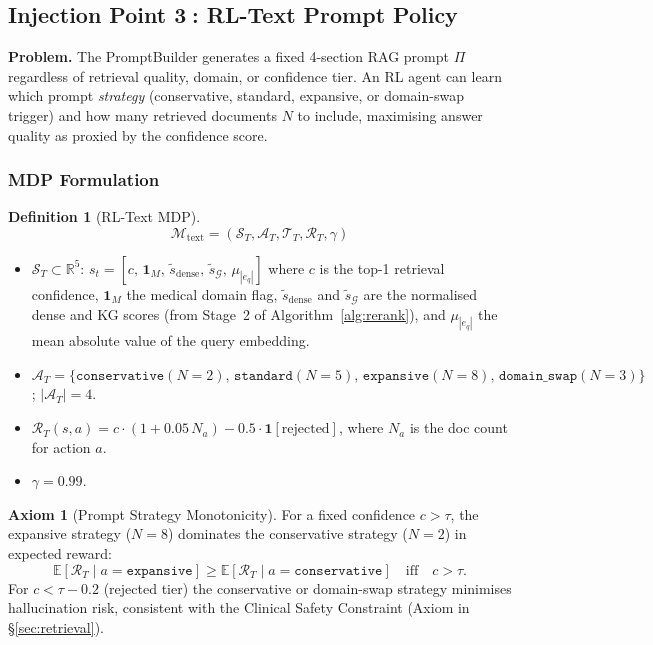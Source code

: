 \documentclass[12pt,a4paper]{article}
\theoremstyle{definition}
\newtheorem{definition}{Definition}[section]
\newtheorem{axiom}{Axiom}[section]
\theoremstyle{plain}
\theoremstyle{remark}
\newcommand{\R}{\mathbb{R}}
\newcommand{\KG}{\mathcal{G}}
\newcommand{\EE}{\mathbb{E}}
\begin{document}
\subsection{Injection Point \textcircled{3}: RL-Text Prompt Policy}
\label{sec:rl_text}

\begin{tcolorbox}[rlinjbox,title={Injection \textcircled{3} --- RL-Text}]
\textbf{Problem.}
The PromptBuilder generates a fixed 4-section RAG prompt $\Pi$ regardless of
retrieval quality, domain, or confidence tier.  An RL agent can learn which
prompt \emph{strategy} (conservative, standard, expansive, or domain-swap trigger)
and how many retrieved documents $N$ to include, maximising answer quality as
proxied by the confidence score.
\end{tcolorbox}

\subsubsection{MDP Formulation}

\begin{definition}[RL-Text MDP]
\label{def:rl_text_mdp}
\[
  \mathcal{M}_{\text{text}} = (\mathcal{S}_T,\mathcal{A}_T,\mathcal{T}_T,\mathcal{R}_T,\gamma)
\]
\begin{itemize}[nosep]
  \item $\mathcal{S}_T \subset \R^5$:
        $s_t = [c,\, \mathbf{1}_{M},\, \tilde{s}_{\text{dense}},\,
        \tilde{s}_{\KG},\, \mu_{|e_q|}]$
        where $c$ is the top-1 retrieval confidence, $\mathbf{1}_M$ the medical
        domain flag, $\tilde{s}_{\text{dense}}$ and $\tilde{s}_\KG$ are the
        normalised dense and KG scores (from Stage~2 of
        Algorithm~\ref{alg:rerank}), and $\mu_{|e_q|}$ the mean absolute value
        of the query embedding.
  \item $\mathcal{A}_T = \{\texttt{conservative}(N{=}2),\,
        \texttt{standard}(N{=}5),\,
        \texttt{expansive}(N{=}8),\,
        \texttt{domain\_swap}(N{=}3)\}$; $|\mathcal{A}_T|=4$.
  \item $\mathcal{R}_T(s,a) = c\cdot(1 + 0.05\,N_{a}) - 0.5\cdot\mathbf{1}[\text{rejected}]$,
        where $N_a$ is the doc count for action $a$.
  \item $\gamma = 0.99$.
\end{itemize}
\end{definition}

\begin{axiom}[Prompt Strategy Monotonicity]
\label{ax:prompt_mono}
For a fixed confidence $c > \tau$, the expansive strategy ($N=8$) dominates
the conservative strategy ($N=2$) in expected reward:
\[
  \EE[\mathcal{R}_T \mid a=\texttt{expansive}] \ge
  \EE[\mathcal{R}_T \mid a=\texttt{conservative}]
  \quad \text{iff}\quad c > \tau.
\]
For $c < \tau - 0.2$ (rejected tier) the conservative or domain-swap
strategy minimises hallucination risk, consistent with the Clinical Safety
Constraint (Axiom in \S\ref{sec:retrieval}).
\end{axiom}
\end{document}
